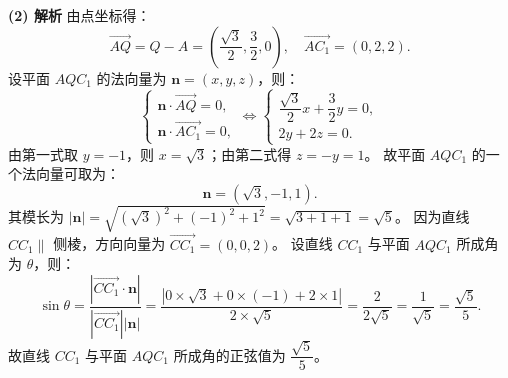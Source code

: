 \begin{answer}
\textbf{(2) 解析}
由点坐标得：
\nopagebreak[4]
\[\overrightarrow{AQ} = Q - A = \left(\frac{\sqrt{3}}{2}, \frac{3}{2}, 0\right), \quad \overrightarrow{AC_1} = (0, 2, 2).\]
设平面 $AQC_1$ 的法向量为 $\boldsymbol n = (x, y, z)$，则：
\nopagebreak[4]
\[\begin{cases} \boldsymbol n \cdot \overrightarrow{AQ} = 0, \\ \boldsymbol n \cdot \overrightarrow{AC_1} = 0, \end{cases} \iff \begin{cases} \dfrac{\sqrt{3}}{2}x + \dfrac{3}{2}y = 0, \\ 2y + 2z = 0. \end{cases}\]
由第一式取 $y = -1$，则 $x = \sqrt{3}$；由第二式得 $z = -y = 1$。
故平面 $AQC_1$ 的一个法向量可取为：
\nopagebreak[4]
\[\boldsymbol n = (\sqrt{3}, -1, 1).\]
其模长为 $|\boldsymbol n| = \sqrt{(\sqrt{3})^2 + (-1)^2 + 1^2} = \sqrt{3 + 1 + 1} = \sqrt{5}$。
因为直线 $CC_1 \parallel$ 侧棱，方向向量为 $\overrightarrow{CC_1} = (0, 0, 2)$。
设直线 $CC_1$ 与平面 $AQC_1$ 所成角为 $\theta$，则：
\nopagebreak[4]
\[\sin\theta = \frac{|\overrightarrow{CC_1} \cdot \boldsymbol n|}{|\overrightarrow{CC_1}| |\boldsymbol n|} = \frac{|0 \times \sqrt{3} + 0 \times (-1) + 2 \times 1|}{2 \times \sqrt{5}} = \frac{2}{2\sqrt{5}} = \frac{1}{\sqrt{5}} = \frac{\sqrt{5}}{5}.\]
故直线 $CC_1$ 与平面 $AQC_1$ 所成角的正弦值为 $\dfrac{\sqrt{5}}{5}$。



\end{answer}
